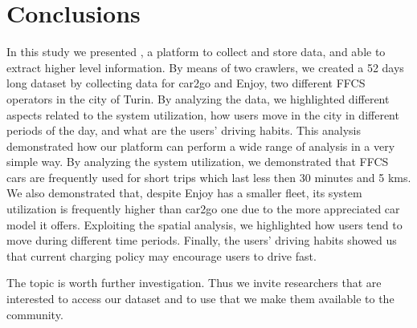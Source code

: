 \section{Conclusions}
\label{sec:conclu}

In this study we presented \tool, a platform to collect and store data, and able to extract higher level information.
By means of two crawlers, we created a 52 days long dataset by collecting data for car2go and Enjoy, two different FFCS operators in the city of Turin.
By analyzing the data, we highlighted different aspects related to the system utilization, how users move in the city in different periods of the day, and what are the users' driving habits.
This analysis demonstrated how our platform can perform a wide range of analysis in a very simple way. By analyzing the system utilization, we demonstrated that FFCS cars are frequently used for short trips which last less then 30 minutes and 5 kms. We also demonstrated that, despite Enjoy has a smaller fleet, its system utilization is frequently higher than car2go one due to the more appreciated car model it offers. Exploiting the spatial analysis, we highlighted how users tend to move during different time periods. Finally, the users' driving habits showed us that current charging policy may encourage users to drive fast. 

The topic is worth further investigation. Thus we invite researchers that are interested to access our dataset and to use \tool that we make them available to the community.